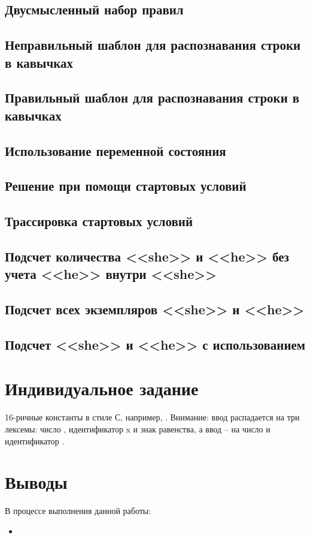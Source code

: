 \subsection{Двусмысленный набор правил}

\subsection{Неправильный шаблон для распознавания строки в кавычках}

\subsection{Правильный шаблон для распознавания строки в кавычках}

\subsection{Использование переменной состояния}

\subsection{Решение при помощи стартовых условий}

\subsection{Трассировка стартовых условий}

\subsection{Подсчет количества <<she>> и <<he>> без учета <<he>> внутри <<she>>}

\subsection{Подсчет всех экземпляров <<she>> и <<he>>}

\subsection{Подсчет <<she>> и <<he>> с использованием }

\section{Индивидуальное задание}

16-ричные константы в стиле С, например, . Внимание: ввод  распадается на три лексемы: число , идентификатор x и знак равенства, а ввод  -- на число  и идентификатор .

\section{Выводы}

В процессе выполнения данной работы:

\begin{itemize}
	\item 
\end{itemize}


